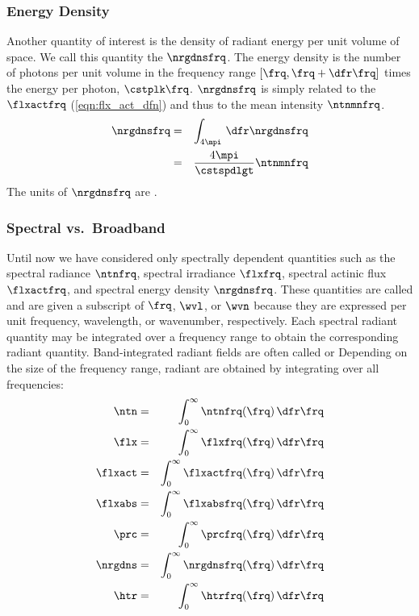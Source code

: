 \documentclass[12pt]{article}
\begin{document}
\subsubsection[Energy Density]{Energy Density}\label{sxn:nrg_dns}
Another quantity of interest is the density of radiant energy per unit
volume of space.
We call this quantity the  $\nrgdnsfrq$.
The energy density is the number of photons per unit volume in the
frequency range $[\frq,\frq + \dfr\frq]$ times the energy per photon, 
$\cstplk \frq$.
$\nrgdnsfrq$ is simply related to the 
$\flxactfrq$ (\ref{eqn:flx_act_dfn}) and thus to the mean intensity
$\ntnmnfrq$.
\begin{eqnarray}
\nrgdnsfrq & = & \int_{4\mpi} \,\dfr\nrgdnsfrq \nonumber \\
& = & \frac{4\mpi}{\cstspdlgt} \ntnmnfrq
\label{eqn:nrg_dns_dfn}
\end{eqnarray}
The units of $\nrgdnsfrq$ are \jxmChz.

\subsubsection[Spectral vs.\ Broadband]{Spectral vs.\ Broadband}\label{sxn:spc_bb}
Until now we have considered only spectrally dependent quantities such
as the spectral radiance $\ntnfrq$, spectral irradiance $\flxfrq$,
spectral actinic flux $\flxactfrq$, and spectral energy density
$\nrgdnsfrq$. 
These quantities are called  and are given a
subscript of $\frq$, $\wvl$, or $\wvn$ because they are expressed per
unit frequency, wavelength, or wavenumber, respectively.  
Each spectral radiant quantity may be integrated over a frequency
range to obtain the corresponding  radiant
quantity.
Band-integrated radiant fields are often called  
or  Depending on the size of the frequency range, 
 radiant
are obtained by integrating over all frequencies:
\begin{eqnarray}
\ntn & = & \int_{0}^{\infty} \ntnfrq(\frq) \,\dfr\frq \nonumber \\
\flx & = & \int_{0}^{\infty} \flxfrq(\frq) \,\dfr\frq \nonumber \\
\flxact & = & \int_{0}^{\infty} \flxactfrq(\frq) \,\dfr\frq \nonumber \\
\flxabs & = & \int_{0}^{\infty} \flxabsfrq(\frq) \,\dfr\frq \nonumber \\
\prc & = & \int_{0}^{\infty} \prcfrq(\frq) \,\dfr\frq \nonumber \\
\nrgdns & = & \int_{0}^{\infty} \nrgdnsfrq(\frq) \,\dfr\frq \nonumber \\
\htr & = & \int_{0}^{\infty} \htrfrq(\frq) \,\dfr\frq \nonumber
\label{eqn:bb_dfn}
\end{eqnarray}
\end{document}
